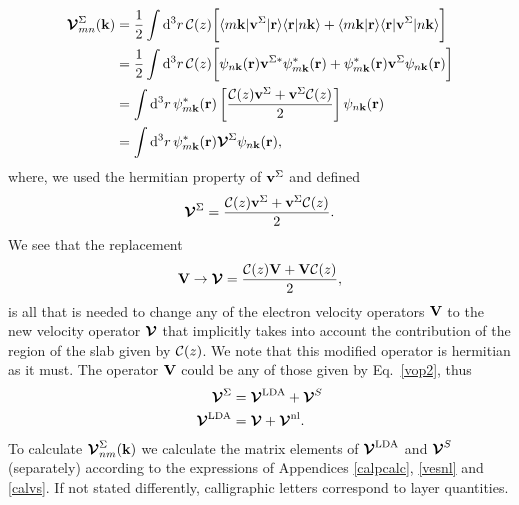 \documentclass[floatfix,prb,aps,superscriptaddress,showpacs,11pt,preprint,letterpaper]{revtex4}
\begin{document}
\begin{align}\label{intj}
{\boldsymbol{\mathcal{V}}}^{\Sigma}_{mn}({\mathbf k})
&=
\frac{1}{2}
\int \mathrm{d}^3 r\,
 {\mathbf{\cal C}}(z)
\bigg[
\langle m\mathbf{k}|\mathbf{v}^\Sigma | \mathbf{r}\rangle
\langle \mathbf{r} | n \mathbf k \rangle +
\langle m\mathbf{k} | \mathbf{r}\rangle
\langle \mathbf{r} | \mathbf{v}^\Sigma | n \mathbf k \rangle\bigg]
\nonumber\\
&=
\frac{1}{2}
\int \mathrm{d}^3 r\,
 {\mathbf{\cal C}}(z)
 \bigg[
\psi_{n\mathbf{k}}(\mathbf{r})
\mathbf{v}^{\Sigma *}\psi^*_{m\mathbf{k}}(\mathbf{r})
+ 
\psi^*_{m\mathbf{k}}(\mathbf{r})\mathbf{v}^\Sigma
\psi_{n\mathbf{k}}(\mathbf{r})
\bigg]
\nonumber\\
&=
\int \mathrm{d}^3 r\,
\psi^*_{m\mathbf{k}}(\mathbf{r})
\left[\frac{{\mathbf{\cal C}}(z) \mathbf{v}^\Sigma +
\mathbf{v}^\Sigma {\mathbf{\cal C}}(z)}{2}\right]
\psi_{n\mathbf{k}}(\mathbf{r})
\nonumber\\
&=
\int \mathrm{d}^3 r\,
\psi^*_{m\mathbf{k}}(\mathbf{r})
\boldsymbol{\mathcal{\cal V}}^{\Sigma}
\psi_{n\mathbf{k}}(\mathbf{r})
,
\end{align}
where, we used the hermitian property of $\mathbf{v}^\Sigma$ and defined
\begin{align}\label{nl.4}
\boldsymbol{\mathcal{\cal V}}^{\Sigma}
=
\frac{{\mathbf{\cal C}}(z) \mathbf{v}^\Sigma +
\mathbf{v}^\Sigma {\mathbf{\cal C}}(z)}{2}
.
\end{align} 
We see that the replacement
\begin{align}\label{vcali}
\mathbf{V} \to \boldsymbol{\mathcal{\cal V}}=\frac{{\mathbf{\cal C}}(z) \mathbf{V} +
\mathbf{V} {\mathbf{\cal C}}(z)}{2}
,
\end{align} 
is all that is needed to change any of the
electron velocity operators $\mathbf{V}$ to the new velocity
operator $\boldsymbol{\mathcal{\cal V}}$ that implicitly takes into account the
contribution of the region of the slab given by ${\mathbf{\cal C}}(z)$.
We note that this modified operator is hermitian as it must.\cite{note2}
The operator $\mathbf{V}$ could be any of those given by Eq.~\eqref{vop2},
thus
\begin{align}\label{vopii}
\boldsymbol{\mathcal{\cal V}}^{\Sigma}
&=
\boldsymbol{\mathcal{\cal V}}^{\mathrm{LDA}}
+
\boldsymbol{\mathcal{\cal V}}^{S}
\nonumber\\
\boldsymbol{\mathcal{\cal V}}^{\mathrm{LDA}}
&=
\boldsymbol{\mathcal{\cal V}}
+
\boldsymbol{\mathcal{\cal V}}^{\mathrm{nl}}
.
\end{align}
To calculate
$\boldsymbol{\mathcal{\cal V}}^{\Sigma}_{nm}(\mathbf{k})$ 
we calculate the matrix elements of 
$\boldsymbol{\mathcal{\cal V}}^{\mathrm{LDA}}$ and $\boldsymbol{\mathcal{\cal V}}^{S}$
 (separately)
according to the expressions of
Appendices \ref{calpcalc}, \ref{vesnl} and \ref{calvs}.
If not stated differently, calligraphic letters correspond to layer quantities. 
\end{document}
